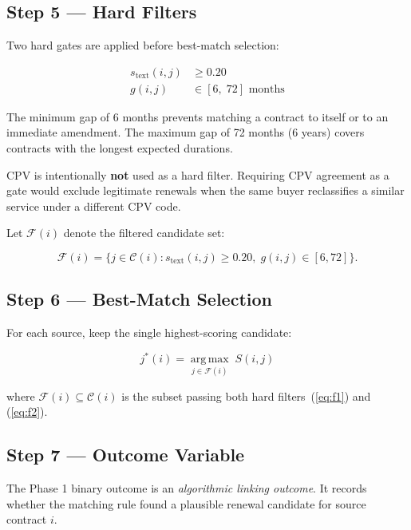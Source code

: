 \documentclass[12pt, a4paper]{article}
\begin{document}
\subsection{Step 5 --- Hard Filters}

Two hard gates are applied before best-match selection:

\begin{align}
  s_{\text{text}}(i,j) &\geq 0.20 \label{eq:f1} \\
  g(i,j) &\in [6,\; 72] \text{ months} \label{eq:f2}
\end{align}

The minimum gap of 6 months prevents matching a contract to itself or to an
immediate amendment. The maximum gap of 72 months (6 years) covers contracts
with the longest expected durations.

\noindent CPV is intentionally \textbf{not} used as a hard filter. Requiring CPV
agreement as a gate would exclude legitimate renewals when the same buyer
reclassifies a similar service under a different CPV code.

Let $\mathcal{F}(i)$ denote the filtered candidate set:

\begin{equation}
  \mathcal{F}(i) =
  \bigl\{
    j \in \mathcal{C}(i) :
    s_{\text{text}}(i,j) \geq 0.20,\;
    g(i,j) \in [6,72]
  \bigr\}.
\end{equation}

\subsection{Step 6 --- Best-Match Selection}

For each source, keep the single highest-scoring candidate:

\begin{equation}
  j^*(i) = \operatorname*{arg\,max}_{j \in \mathcal{F}(i)}\; S(i,j)
\end{equation}

where $\mathcal{F}(i) \subseteq \mathcal{C}(i)$ is the subset passing both
hard filters~(\ref{eq:f1}) and (\ref{eq:f2}).

\subsection{Step 7 --- Outcome Variable}

The Phase 1 binary outcome is an \emph{algorithmic linking outcome}. It records
whether the matching rule found a plausible renewal candidate for source
contract $i$.
\end{document}
